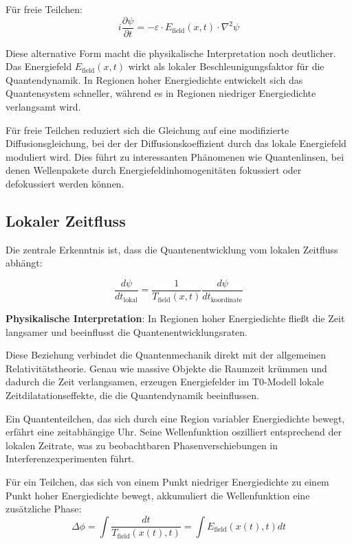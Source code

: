 \documentclass[12pt,a4paper]{article}
\theoremstyle{definition}
\theoremstyle{remark}
\begin{document}
F{\"u}r freie Teilchen:
\begin{equation}
	\boxed{i \frac{\partial\psi}{\partial t} = -\varepsilon \cdot E_{\text{field}}(x,t) \cdot \nabla^2 \psi}
	\label{eq:t0_schrodinger_free}
\end{equation}

Diese alternative Form macht die physikalische Interpretation noch deutlicher. Das Energiefeld $E_{\text{field}}(x,t)$ wirkt als lokaler Beschleunigungsfaktor f{\"u}r die Quantendynamik. In Regionen hoher Energiedichte entwickelt sich das Quantensystem schneller, w{\"a}hrend es in Regionen niedriger Energiedichte verlangsamt wird.

F{\"u}r freie Teilchen reduziert sich die Gleichung auf eine modifizierte Diffusionsgleichung, bei der der Diffusionskoeffizient durch das lokale Energiefeld moduliert wird. Dies f{\"u}hrt zu interessanten Ph{\"a}nomenen wie Quantenlinsen, bei denen Wellenpakete durch Energiefeldinhomogenit{\"a}ten fokussiert oder defokussiert werden k{\"o}nnen.

\subsection{Lokaler Zeitfluss}

Die zentrale Erkenntnis ist, dass die Quantenentwicklung vom lokalen Zeitfluss abh{\"a}ngt:

\begin{equation}
	\frac{d\psi}{dt_{\text{lokal}}} = \frac{1}{T_{\text{field}}(x,t)} \frac{d\psi}{dt_{\text{koordinate}}}
	\label{eq:local_time_flow}
\end{equation}

\textbf{Physikalische Interpretation}: In Regionen hoher Energiedichte flie{\ss}t die Zeit langsamer und beeinflusst die Quantenentwicklungsraten.

Diese Beziehung verbindet die Quantenmechanik direkt mit der allgemeinen Relativit{\"a}tstheorie. Genau wie massive Objekte die Raumzeit kr{\"u}mmen und dadurch die Zeit verlangsamen, erzeugen Energiefelder im T0-Modell lokale Zeitdilatationseffekte, die die Quantendynamik beeinflussen.

Ein Quantenteilchen, das sich durch eine Region variabler Energiedichte bewegt, erf{\"a}hrt eine zeitabh{\"a}ngige Uhr. Seine Wellenfunktion oszilliert entsprechend der lokalen Zeitrate, was zu beobachtbaren Phasenverschiebungen in Interferenzexperimenten f{\"u}hrt.

F{\"u}r ein Teilchen, das sich von einem Punkt niedriger Energiedichte zu einem Punkt hoher Energiedichte bewegt, akkumuliert die Wellenfunktion eine zus{\"a}tzliche Phase:
$$\Delta \phi = \int \frac{dt}{T_{\text{field}}(x(t), t)} = \int E_{\text{field}}(x(t), t) dt$$
\end{document}
